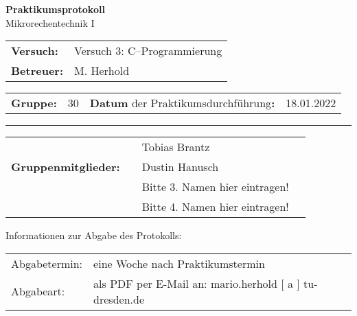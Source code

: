 \documentclass[oneside,a4paper,12pt]{article}
\def\Betreuer{M. Herhold}
\def\Gruppennummer{ 30  }
\def\DatumDerDurchführung{18.01.2022}
\def\StudentEins{Tobias Brantz}
\def\StudentZwei{Dustin Hanusch}
\def\StudentDrei{Bitte 3. Namen hier eintragen!}
\def\StudentVier{Bitte 4. Namen hier eintragen!}
\begin{document}
\begin{center}
    {\Huge \textbf{Praktikumsprotokoll}\\}
    \bigskip
    {\Large Mikrorechentechnik I}\\
\end{center}

\vfill

\renewcommand{\arraystretch}{1.2}

\begin{tabularx}{\textwidth}{p{2cm} X}
    \textbf{Versuch:} & Versuch 3: C--Programmierung \\[3em]
  \textbf{Betreuer:} & \Betreuer \\ \cline{2-2}
\end{tabularx}

\begin{tabularx}{\textwidth}{p{2cm} p{0.38cm} X p{2.2cm}}
  \textbf{Gruppe:} & \Gruppennummer & \hfill \textbf{Datum} {\small der Praktikumsdurchführung}\textbf{:} & \DatumDerDurchführung \\
  \cline{2-2} \cline{4-4}
\end{tabularx}

\vfill

\renewcommand{\arraystretch}{3}
\rule{\textwidth}{0.5mm}
\begin{tabularx}{\textwidth}{p{4.2cm} | p{0.5cm} X p{0.5cm}}
  & & \StudentEins & \\ \cline{3-3}
  \textbf{Gruppenmitglieder:} & & \StudentZwei & \\  \cline{3-3}
  & & \StudentDrei & \\  \cline{3-3}
  & & \StudentVier & \\  \cline{3-3}
\end{tabularx}

\vfill
\vfill
\renewcommand{\arraystretch}{1}
Informationen zur Abgabe des Protokolls:\\[0.8em]
{\small
    \begin{tabularx}{\textwidth}{p{2.4cm} X}
        Abgabetermin:    & eine Woche nach Praktikumstermin\\[0.6em]
        Abgabeart:       & als PDF per E-Mail an: mario.herhold [ a ] tu-dresden.de\\
    \end{tabularx}}
\end{document}

